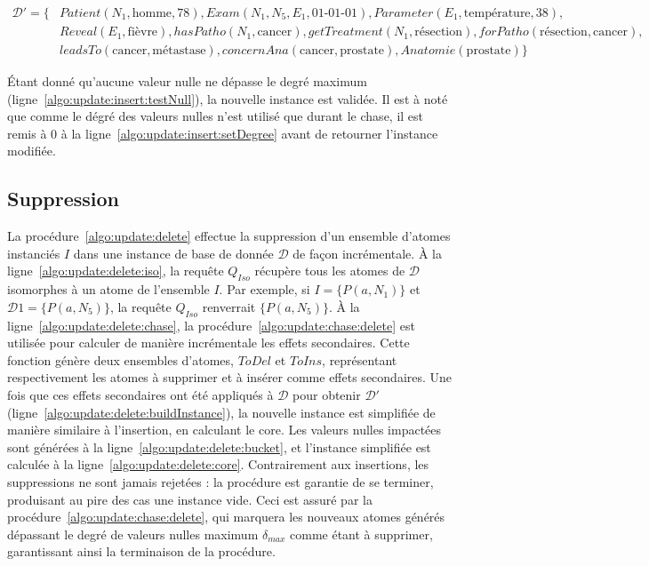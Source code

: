 \begin{example}
    \begin{align*}
        \mathcal{D}' = \{ & Patient(N_1, \text{homme}, 78), Exam(N_1, N_5, E_1, \text{01-01-01}), Parameter(E_1, \text{température}, 38),                             \\
                          & Reveal(E_1, \text{fièvre}), hasPatho(N_1, \text{cancer}), getTreatment(N_1, \text{résection}), forPatho(\text{résection}, \text{cancer}), \\
                          & leadsTo(\text{cancer}, \text{métastase}), concernAna(\text{cancer}, \text{prostate}), Anatomie(\text{prostate}) \}
    \end{align*}

    Étant donné qu'aucune valeur nulle ne dépasse le degré maximum (ligne~\ref{algo:update:insert:testNull}), la nouvelle instance est validée.
    Il est à noté que comme le dégré des valeurs nulles n'est utilisé que durant le \gls{chase}, il est remis à $0$ à la ligne~\ref{algo:update:insert:setDegree} avant de retourner l'instance modifiée.
\end{example}

\subsection{Suppression}
\label{sec:update:delete}
La procédure~\ref{algo:update:delete} effectue la suppression d'un ensemble d'atomes instanciés $I$ dans une instance de base de donnée $\mathcal{D}$ de façon incrémentale.
À la ligne~\ref{algo:update:delete:iso}, la requête $Q_{Iso}$ récupère tous les atomes de $\mathcal{D}$ isomorphes à un atome de l'ensemble $I$.
Par exemple, si $I = \{P(a, N_1)\}$ et $\mathcal{D}1= \{P(a, N_5)\}$, la requête $Q_{Iso}$ renverrait $\{P(a, N_5)\}$.
À la ligne~\ref{algo:update:delete:chase}, la procédure~\ref{algo:update:chase:delete} est utilisée pour calculer de manière incrémentale les effets secondaires.
Cette fonction génère deux ensembles d'atomes, $ToDel$ et $ToIns$, représentant respectivement les atomes à supprimer et à insérer comme effets secondaires.
Une fois que ces effets secondaires ont été appliqués à $\mathcal{D}$ pour obtenir $\mathcal{D}'$ (ligne~\ref{algo:update:delete:buildInstance}), la nouvelle instance est simplifiée de manière similaire à l'insertion, en calculant le \gls{core}.
Les valeurs nulles impactées sont générées à la ligne~\ref{algo:update:delete:bucket}, et l'instance simplifiée est calculée à la ligne~\ref{algo:update:delete:core}.
Contrairement aux insertions, les suppressions ne sont jamais rejetées : la procédure est garantie de se terminer, produisant au pire des cas une instance vide.
Ceci est assuré par la procédure~\ref{algo:update:chase:delete}, qui marquera les nouveaux atomes générés dépassant le degré de valeurs nulles maximum $\delta_{max}$ comme étant à supprimer, garantissant ainsi la terminaison de la procédure.

